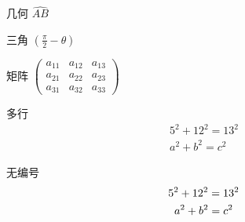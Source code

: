 \documentclass[a4paper,11pt]{article}
\begin{document}
\begin{CJK}{UTF8}{gkai}
几何
$ \widehat{AB} $

三角
$\left(\frac{\pi}{2}-\theta \right )$

矩阵
$\begin{pmatrix}
 a_{11} & a_{12} & a_{13}\\ 
 a_{21} & a_{22} & a_{23}\\ 
 a_{31} & a_{32} & a_{33}
 \end{pmatrix}$
 
 多行  \begin{gather}
 5^2+12^2=13^2\\
 a^2 + b^2 = c^2
 \end{gather}
 
 无编号 \begin{gather}
 5^2+12^2=13^2 \notag\\
 a^2 + b^2 = c^2\notag
\end{gather}
 
\end{CJK}
\end{document}
